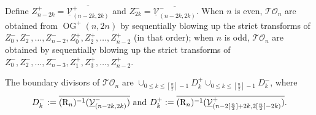 \documentclass[10pt]{amsart}
\theoremstyle{definition}
\newtheorem{definition}[theorem]{Definition}
\newcommand{\OG}{\operatorname{OG}}
\newcommand{\TO}{\mathcal{TO}}
\newcommand{\RL}{\mathrm{R}}
\theoremstyle{plain} %
\begin{document}
Define $Z^+_{n-2k}=\overline{\underline{\mathcal V}_{(n-2k,2k)}^+}$ and  $Z^-_{2k}=\overline{\underline{\mathcal V}_{(n-2k,2k)}^-}$.   
When $n$ is even, $\TO_n$ are obtained from $\OG^+(n,2n)$ by sequentially blowing up the strict transforms of $Z_0^-,Z_2^-,\dots,Z_{n-2}^-, Z_{0}^+,Z_{2}^+,\dots,Z_{n-2}^+$ (in that order); when $n$ is odd, $\TO_n$ are obtained by sequentially blowing up the strict transforms of $Z_0^-,Z_2^-,\dots,Z_{n-3}^-, Z_{1}^+,Z_{3}^+,\dots,Z_{n-2}^+$. 

The boundary divisors of $\mathcal {TO}_{n}$ are 
$\cup_{0\leq k\leq [\frac{n}{2}]-1}D_{k}^+\cup_{0\leq k\leq [\frac{n}{2}]-1}D_{k}^-$, where
\begin{equation*}
D_{k}^-:=\overline{(\RL_{n})^{-1}({\underline{\mathcal V}_{(n-2k,2k)}^-})}\,\,{\rm and} \,\,D_{k}^+:=\overline{(\RL_{n})^{-1}({\underline{\mathcal V}_{(n-2[\frac{n}{2}]+2k,2[\frac{n}{2}]-2k)}^+})}.    
\end{equation*}
\end{document}

